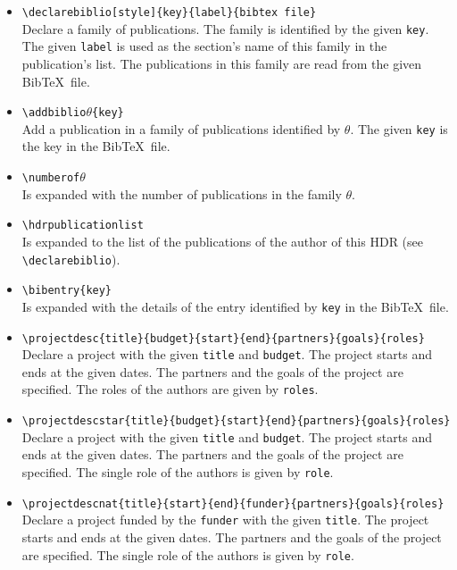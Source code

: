 \documentclass[english]{spimufchdr}
\begin{document}
\begin{itemize}
\item \texttt{{\textbackslash}declarebiblio[style]\{key\}\{label\}\{bibtex file\}} \\
	Declare a family of publications. The family is identified by the given \texttt{key}. The given \texttt{label} is used as the section's name of this family in the publication's list. The publications in this family are read from the given Bib\TeX\ file.
\item \texttt{{\textbackslash}addbiblio\ensuremath{\theta}\{key\}} \\
	Add a publication in a family of publications identified by $\theta$. The given \texttt{key} is the key in the Bib\TeX\ file.
\item \texttt{{\textbackslash}numberof\ensuremath{\theta}} \\
	Is expanded with the number of publications in the family $\theta$.
\item \texttt{{\textbackslash}hdrpublicationlist} \\
	Is expanded to the list of the publications of the author of this HDR (see \texttt{{\textbackslash}declarebiblio}).
\item \texttt{{\textbackslash}bibentry\{key\}} \\
	Is expanded with the details of the entry identified by \texttt{key} in the Bib\TeX\ file.
\item \texttt{{\textbackslash}projectdesc\{title\}\{budget\}\{start\}\{end\}\{partners\}\{goals\}\{roles\}} \\
	Declare a project with the given \texttt{title} and \texttt{budget}. The project starts and ends at the given dates. The partners and the goals of the project are specified. The roles of the authors are given by \texttt{roles}.
\item \texttt{{\textbackslash}projectdescstar\{title\}\{budget\}\{start\}\{end\}\{partners\}\{goals\}\{roles\}} \\
	Declare a project with the given \texttt{title} and \texttt{budget}. The project starts and ends at the given dates. The partners and the goals of the project are specified. The single role of the authors is given by \texttt{role}.
\item \texttt{{\textbackslash}projectdescnat\{title\}\{start\}\{end\}\{funder\}\{partners\}\{goals\}\{roles\}} \\
	Declare a project funded by the \texttt{funder} with the given \texttt{title}. The project starts and ends at the given dates. The partners and the goals of the project are specified. The single role of the authors is given by \texttt{role}.
\end{itemize}
\end{document}
